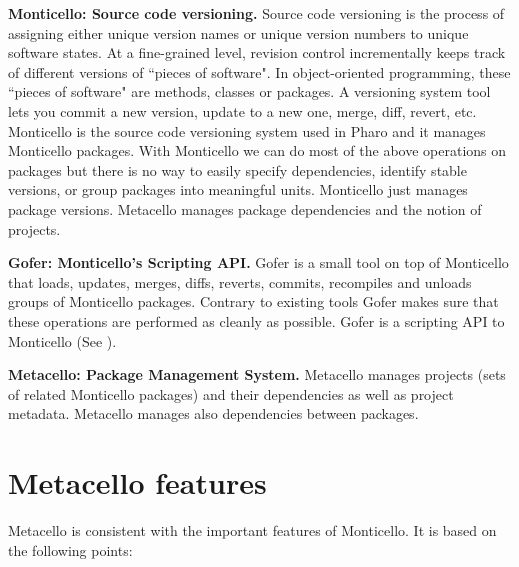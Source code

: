 \documentclass[a4paper,10pt,twoside]{book}
\begin{document}
\begin{description}

\item{\textbf{Monticello: Source code versioning.}}
Source code versioning is the process of assigning either unique version names or unique version numbers to unique software states. At a fine-grained level, revision control incrementally keeps track of different versions of ``pieces of software". In object-oriented programming, these ``pieces of software" are methods, classes or packages. A versioning system tool lets you commit a new version, update to a new one, merge, diff, revert, etc. Monticello is the source code versioning system used in Pharo and it manages Monticello packages. With Monticello we can do most of the above operations on packages but there is no way to easily specify dependencies, identify stable versions, or group packages into meaningful units.  Monticello just manages package versions. Metacello manages package dependencies and the notion of projects.

\item {\textbf{Gofer: Monticello's Scripting API.}}
Gofer is a small tool on top of Monticello that loads, updates, merges, diffs, reverts, commits, recompiles and unloads groups of Monticello packages. Contrary to existing tools Gofer makes sure that these operations are performed as cleanly as possible. Gofer is a scripting API to Monticello (See ).


\item{\textbf{Metacello: Package Management System.}} Metacello manages projects (sets of related Monticello packages) and their dependencies as well as project metadata. Metacello manages also dependencies between packages.
\end{description}




\section{Metacello features}

Metacello is consistent with the important features of Monticello. It is based on the following points:
\end{document}
